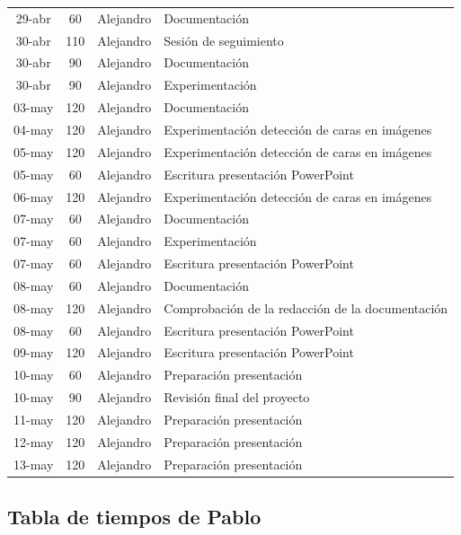 \documentclass[a4paper]{article}
\begin{document}
\begin{center}
\begin{longtable}{|c|c|c|p{8cm}|}
29-abr & 60  & Alejandro & Documentación \\
30-abr & 110 & Alejandro & Sesión de seguimiento \\
30-abr & 90  & Alejandro & Documentación \\
30-abr & 90  & Alejandro & Experimentación \\
03-may & 120 & Alejandro & Documentación \\
04-may & 120 & Alejandro & Experimentación detección de caras en imágenes \\
05-may & 120 & Alejandro & Experimentación detección de caras en imágenes \\
05-may & 60  & Alejandro & Escritura presentación PowerPoint \\
06-may & 120 & Alejandro & Experimentación detección de caras en imágenes \\
07-may & 60  & Alejandro & Documentación \\
07-may & 60  & Alejandro & Experimentación \\
07-may & 60  & Alejandro & Escritura presentación PowerPoint \\
08-may & 60  & Alejandro & Documentación \\
08-may & 120 & Alejandro & Comprobación de la redacción de la documentación \\
08-may & 60  & Alejandro & Escritura presentación PowerPoint \\
09-may & 120 & Alejandro & Escritura presentación PowerPoint \\
10-may & 60  & Alejandro & Preparación presentación \\
10-may & 90  & Alejandro & Revisión final del proyecto \\
11-may & 120 & Alejandro & Preparación presentación \\
12-may & 120 & Alejandro & Preparación presentación \\
13-may & 120 & Alejandro & Preparación presentación \\
\hline
\end{longtable}
\end{center}

\subsection{Tabla de tiempos de Pablo}
\end{document}
